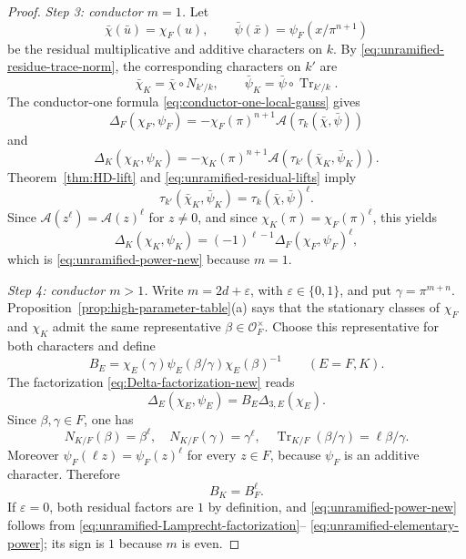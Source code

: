 \documentclass[11pt]{amsart}
\theoremstyle{definition}
\theoremstyle{remark}
\newcommand{\cO}{\mathcal O}
\newcommand{\Tr}{\operatorname{Tr}}
\newcommand{\Aphase}{\mathcal A}
\begin{document}
\begin{proof}
\smallskip
\noindent\emph{Step 3: conductor $m=1$.}
Let
\[
 \bar\chi(\bar u)=\chi_F(u),
 \qquad
 \bar\psi(\bar x)=\psi_F(x/\pi^{n+1})
\]
be the residual multiplicative and additive characters on $k$.  By
\eqref{eq:unramified-residue-trace-norm}, the corresponding characters
on $k'$ are
\begin{equation}\label{eq:unramified-residual-lifts}
 \bar\chi_K=\bar\chi\circ N_{k'/k},
 \qquad
 \bar\psi_K=\bar\psi\circ\Tr_{k'/k}.
\end{equation}
The conductor-one formula \eqref{eq:conductor-one-local-gauss} gives
\[
 \Delta_F(\chi_F,\psi_F)
 =-\chi_F(\pi)^{n+1}
   \Aphase\!\left(\tau_k(\bar\chi,\bar\psi)\right)
\]
and
\[
 \Delta_K(\chi_K,\psi_K)
 =-\chi_K(\pi)^{n+1}
   \Aphase\!\left(\tau_{k'}(\bar\chi_K,\bar\psi_K)\right).
\]
Theorem~\ref{thm:HD-lift} and
\eqref{eq:unramified-residual-lifts} imply
\[
 \tau_{k'}(\bar\chi_K,\bar\psi_K)
 =\tau_k(\bar\chi,\bar\psi)^\ell.
\]
Since $\Aphase(z^\ell)=\Aphase(z)^\ell$ for $z\ne0$, and since
$\chi_K(\pi)=\chi_F(\pi)^\ell$, this yields
\[
 \Delta_K(\chi_K,\psi_K)
 =(-1)^{\ell-1}\Delta_F(\chi_F,\psi_F)^\ell,
\]
which is \eqref{eq:unramified-power-new} because $m=1$.

\smallskip
\noindent\emph{Step 4: conductor $m>1$.}
Write $m=2d+\varepsilon$, with $\varepsilon\in\{0,1\}$, and put
$\gamma=\pi^{m+n}$.  Proposition~\ref{prop:high-parameter-table}(a)
says that the stationary classes of $\chi_F$ and $\chi_K$ admit the
same representative $\beta\in\cO_F^\times$.  Choose this representative
for both characters and define
\[
 B_E=\chi_E(\gamma)\psi_E(\beta/\gamma)
      \chi_E(\beta)^{-1}\qquad(E=F,K).
\]
The factorization \eqref{eq:Delta-factorization-new} reads
\begin{equation}\label{eq:unramified-Lamprecht-factorization}
 \Delta_E(\chi_E,\psi_E)=B_E\Delta_{3,E}(\chi_E).
\end{equation}
Since $\beta,\gamma\in F$, one has
\[
 N_{K/F}(\beta)=\beta^\ell,
 \quad N_{K/F}(\gamma)=\gamma^\ell,
 \quad \Tr_{K/F}(\beta/\gamma)=\ell\beta/\gamma.
\]
Moreover $\psi_F(\ell z)=\psi_F(z)^\ell$ for every $z\in F$, because
$\psi_F$ is an additive character.  Therefore
\begin{equation}\label{eq:unramified-elementary-power}
 B_K=B_F^\ell.
\end{equation}
If $\varepsilon=0$, both residual factors are $1$ by definition, and
\eqref{eq:unramified-power-new} follows from
\eqref{eq:unramified-Lamprecht-factorization}--
\eqref{eq:unramified-elementary-power}; its sign is $1$ because $m$ is
even.


\end{proof}
\end{document}
